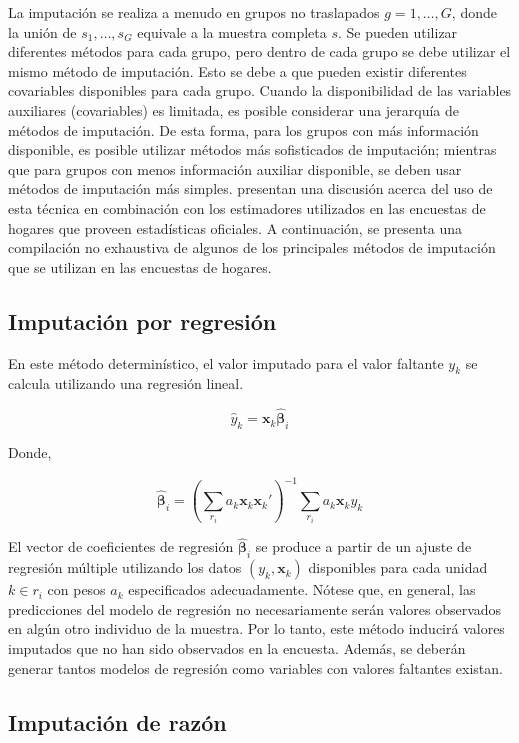 \documentclass[
  12pt,
  spanish,
]{book}
\begin{document}
La imputación se realiza a menudo en grupos no traslapados \(g= 1, \ldots, G\), donde la unión de \(s_1, \ldots, s_G\) equivale a la muestra completa \(s\). Se pueden utilizar diferentes métodos para cada grupo, pero dentro de cada grupo se debe utilizar el mismo método de imputación. Esto se debe a que pueden existir diferentes covariables disponibles para cada grupo. Cuando la disponibilidad de las variables auxiliares (covariables) es limitada, es posible considerar una jerarquía de métodos de imputación. De esta forma, para los grupos con más información disponible, es posible utilizar métodos más sofisticados de imputación; mientras que para grupos con menos información auxiliar disponible, se deben usar métodos de imputación más simples. \citet{Sarndal_Lundstrom_2006} presentan una discusión acerca del uso de esta técnica en combinación con los estimadores utilizados en las encuestas de hogares que proveen estadísticas oficiales. A continuación, se presenta una compilación no exhaustiva de algunos de los principales métodos de imputación que se utilizan en las encuestas de hogares.

\hypertarget{imputaciuxf3n-por-regresiuxf3n}{%
\subsection{Imputación por regresión}\label{imputaciuxf3n-por-regresiuxf3n}}

En este método determinístico, el valor imputado para el valor faltante \(y_k\) se calcula utilizando una regresión lineal.

\[
\hat{y}_k = \mathbf{x}_k \hat{\boldsymbol{\beta}}_i
\]

Donde,

\[
\hat{\boldsymbol{\beta}}_i = \left(\sum_{r_i} a_k\mathbf{x}_k\mathbf{x}_k'\right)^{-1}
\sum_{r_i} a_k\mathbf{x}_ky_k
\]

El vector de coeficientes de regresión \(\hat{\boldsymbol{\beta}}_i\) se produce a partir de un ajuste de regresión múltiple utilizando los datos \((y_k, \mathbf{x}_k)\) disponibles para cada unidad \(k \in r_i\) con pesos \(a_k\) especificados adecuadamente. Nótese que, en general, las predicciones del modelo de regresión no necesariamente serán valores observados en algún otro individuo de la muestra. Por lo tanto, este método inducirá valores imputados que no han sido observados en la encuesta. Además, se deberán generar tantos modelos de regresión como variables con valores faltantes existan.

\hypertarget{imputaciuxf3n-de-razuxf3n}{%
\subsection{Imputación de razón}\label{imputaciuxf3n-de-razuxf3n}}
\end{document}
